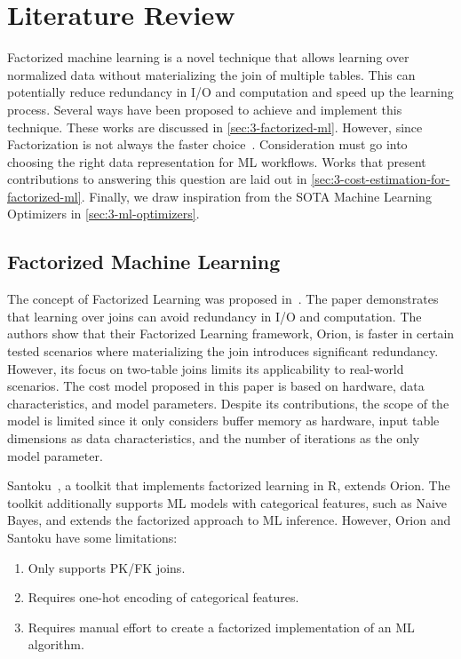 
\chapter{Literature Review}
\label{chapter:literature}

Factorized machine learning is a novel technique that allows learning over normalized data without materializing the join of multiple tables. This can potentially reduce redundancy in I/O and computation and speed up the learning process. Several ways have been proposed to achieve and implement this technique. These works are discussed in \autoref{sec:3-factorized-ml}. However, since Factorization is not always the faster choice~\cite{orion_learning_gen_lin_models, morpheus, amalur,amalur_tkde24}. Consideration must go into choosing the right data representation for ML workflows. Works that present contributions to answering this question are laid out in \autoref{sec:3-cost-estimation-for-factorized-ml}. Finally, we draw inspiration from the SOTA Machine Learning Optimizers in \autoref{sec:3-ml-optimizers}.

\section{Factorized Machine Learning}
\label{sec:3-factorized-ml}
The concept of Factorized Learning was proposed in~\cite{orion_learning_gen_lin_models}. The paper demonstrates that learning over joins can avoid redundancy in I/O and computation. The authors show that their Factorized Learning framework, Orion, is faster in certain tested scenarios where materializing the join introduces significant redundancy. However, its focus on two-table joins limits its applicability to real-world scenarios. The cost model proposed in this paper is based on hardware, data characteristics, and model parameters. Despite its contributions, the scope of the model is limited since it only considers buffer memory as hardware, input table dimensions as data characteristics, and the number of iterations as the only model parameter.

Santoku~\cite{santoku_kumar_demonstration_2015}, a toolkit that implements factorized learning in R, extends Orion. The toolkit additionally supports ML models with categorical features, such as Naive Bayes, and extends the factorized approach to ML inference. However, Orion and Santoku have some limitations:

\begin{enumerate}
  \item Only supports PK/FK joins.
  \item Requires one-hot encoding of categorical features.
  \item Requires manual effort to create a factorized implementation of an ML algorithm.
\end{enumerate}

